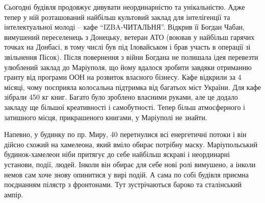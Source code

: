 
Сьогодні будівля продовжує дивувати неординарністю та унікальністю. Адже тепер
у ній розташований найбільш культовий заклад для інтелігенції та
інтелектуальної молоді – кафе \enquote{IZBA-ЧИТАЛЬНЯ}. Відкрив її Богдан Чабан,
вимушений переселенець з Донецьку, ветеран АТО (воював у найбільш гарячих
точках на Донбасі, в тому числі був під Іловайськом і брав участь в операції зі
звільнення Пісок). Після повернення з війни Богдана не полишала ідея перевезти
улюблений заклад до Маріуполя, що йому вдалося зробити завдяки отриманню гранту
від програми ООН на розвиток власного бізнесу. Кафе відкрили за 4 місяці, чому
посприяла колосальна підтримка від багатьох міст України. Для кафе зібрали 450
кг книг. Багато було зроблено власними руками, але це додало закладу ще більшої
креативності і самобутності. Тепер більш атмосферного і затишного місця,
прикрашеного книгами, у Маріуполі не знайти.

Напевно, у будинку по пр. Миру, 40 перетнулися всі енергетичні потоки і він
дійсно схожий на хамелеона, який вміло обирає потрібну маску. Маріупольський
будинок-хамелеон ніби притягує до себе найбільш яскраві і неординарні установи,
події, людей. Інколи він обирає для себе нові ролі вимушено, а інколи немов сам
хоче знову опинитися у вирі подій. А сама по собі будівля приємна поєднанням
пілястр з фронтонами. Тут зустрічаються бароко та сталінський ампір.

